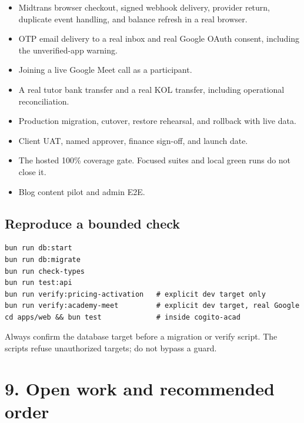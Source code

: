 \documentclass[11pt,a4paper]{article}
\begin{document}
\begin{itemize}
	\item Midtrans browser checkout, signed webhook delivery, provider return, duplicate event handling, and balance refresh in a real browser.
	\item OTP email delivery to a real inbox and real Google OAuth consent, including the unverified-app warning.
	\item Joining a live Google Meet call as a participant.
	\item A real tutor bank transfer and a real KOL transfer, including operational reconciliation.
	\item Production migration, cutover, restore rehearsal, and rollback with live data.
	\item Client UAT, named approver, finance sign-off, and launch date.
	\item The hosted 100\% coverage gate. Focused suites and local green runs do not close it.
	\item Blog content pilot and admin E2E.
\end{itemize}

\subsection{Reproduce a bounded check}

\begin{verbatim}
bun run db:start
bun run db:migrate
bun run check-types
bun run test:api
bun run verify:pricing-activation   # explicit dev target only
bun run verify:academy-meet         # explicit dev target, real Google
cd apps/web && bun test             # inside cogito-acad
\end{verbatim}

Always confirm the database target before a migration or verify script. The scripts refuse unauthorized targets; do not bypass a guard.

\section{9. Open work and recommended order}
\end{document}
